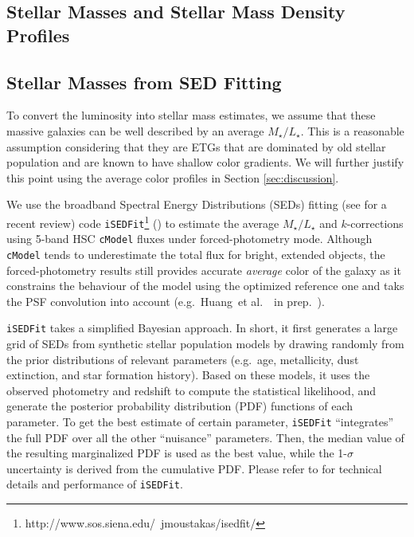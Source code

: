 \documentclass{emulateapj}
\def\etal{{\ et al.~}}
\def\cmodel{\texttt{cModel}}
\def\m2l{{$M_{\star}/L_{\star}$}}
\begin{document}
\begin{CJK*}{UTF8}{gbsn}
\section{Stellar Masses and Stellar Mass Density Profiles}
    \label{sec:mstar}
    
\subsection{Stellar Masses from SED Fitting}
    \label{ssec:isedfit}
   
    To convert the luminosity into stellar mass estimates, we assume that these massive 
    galaxies can be well described by an average \m2l{}. 
    This is a reasonable assumption considering that they are ETGs that are dominated by 
    old stellar population and are known to have shallow color gradients. 
    We will further justify this point using the average color profiles in Section
    \ref{sec:discussion}.

    We use the broadband Spectral Energy Distributions (SEDs) fitting 
    (see \citealt{Walcher2011} for a recent review) code 
    \texttt{iSEDFit}\footnote{http://www.sos.siena.edu/~jmoustakas/isedfit/} 
    (\citealt{Moustakas13}) to estimate the average \m2l{} and $k$-corrections using
    5-band HSC \cmodel{} fluxes under forced-photometry mode. 
    Although \cmodel{} tends to underestimate the total flux for bright, extended 
    objects, the forced-photometry results still provides accurate \emph{average} color 
    of the galaxy as it constrains the behaviour of the model using the optimized 
    reference one and taks the PSF convolution into account
    (e.g.\ Huang\etal~in prep.~). 

    \texttt{iSEDFit} takes a simplified Bayesian approach. 
    In short, it first generates a large grid of SEDs from synthetic stellar population 
    models by drawing randomly from the prior distributions of relevant parameters 
    (e.g.\ age, metallicity, dust extinction, and star formation history).
    Based on these models, it uses the observed photometry and redshift to compute the 
    statistical likelihood, and generate the posterior probability distribution (PDF) 
    functions of each parameter.  
    To get the best estimate of certain parameter, \texttt{iSEDFit} ``integrates'' the 
    full PDF over all the other ``nuisance'' parameters.
    Then, the median value of the resulting marginalized PDF is used as the best value, 
    while the 1-$\sigma$ uncertainty is derived from the cumulative PDF. 
    Please refer to \citet{Moustakas13} for technical details and performance of 
    \texttt{iSEDFit}. 
    

\end{CJK*}
\end{document}
